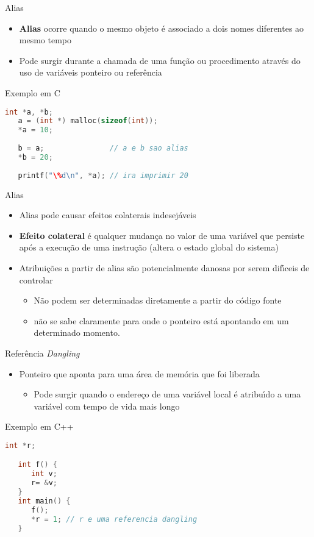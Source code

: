 \documentclass[handout,aspectratio=169]{beamer}
\newcommand{\bi}{\begin{itemize}[<+->]}
\newcommand{\ei}{\end{itemize}}
\begin{document}
\begin{frame}[fragile]{Alias}

   \bi 
   \item \textbf{Alias} ocorre quando o mesmo objeto \'{e} associado a dois nomes diferentes ao mesmo tempo
   \item Pode surgir durante a chamada de uma fun\c{c}\~{a}o ou procedimento atrav\'{e}s do uso de vari\'{a}veis ponteiro ou refer\^{e}ncia
   \ei

	\begin{block}{Exemplo em C}
	\begin{lstlisting}[language=c,numbers=none, basicstyle=\tiny]
   int *a, *b;
   a = (int *) malloc(sizeof(int));
   *a = 10;
   
   b = a;               // a e b sao alias
   *b = 20;
	
   printf("\%d\n", *a); // ira imprimir 20
   \end{lstlisting}
   \end{block}	
\end{frame}

\begin{frame}{Alias}

   \bi 
   \item Alias pode causar efeitos colaterais indesej\'{a}veis
   \item \textbf{Efeito colateral} \'{e} qualquer mudan\c{c}a no valor de uma vari\'{a}vel que persiste ap\'{o}s a execu\c{c}\~{a}o de uma instru\c{c}\~{a}o (altera o estado global do sistema)
   \item Atribui\c{c}\~{o}es a partir de alias s\~{a}o potencialmente danosas por serem dif\'{\i}ceis de controlar
		\bi
		\item N\~{a}o podem ser determinadas diretamente a partir do c\'{o}digo fonte
		\item n\~{a}o se sabe claramente para onde o ponteiro est\'{a} apontando em um determinado momento.
		\ei
   \ei

\end{frame}


\begin{frame}[fragile]{Refer\^{e}ncia \textit{Dangling}}

   \bi 
   \item Ponteiro que aponta para uma \'{a}rea de mem\'{o}ria que foi liberada
      \bi 
      \item Pode surgir quando o endere\c{c}o de uma vari\'{a}vel local \'{e} atribu\'{\i}do a uma vari\'{a}vel com tempo de vida mais longo
			\ei
   \ei

	\begin{block}{Exemplo em C++}
	\begin{lstlisting}[language=c++,numbers=none,basicstyle=\tiny]
   int *r;

   int f() {
      int v;
      r= &v;
   }
   int main() {
      f();  	
      *r = 1; // r e uma referencia dangling
   }
   \end{lstlisting}
   \end{block}	
\end{frame}
\end{document}
